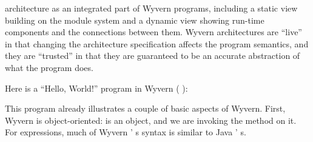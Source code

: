 \documentclass{article}
\begin{document}
\begin{mdUl}[class={ul,list-star,compact},elem={ul},data-line={36}]
\begin{mdLi}[class={li,ul-li,list-star-li,compact-li},label={[(4)]\{.ul-li-label\}},elem={li},data-line={55}]
\begin{mdP}[data-line={55}]
architecture as an integrated part of Wyvern programs, including a
static view building on the module system and a dynamic view showing
run-time components and the connections between them.  Wyvern
architectures are %
{}{\textquotedblleft}live{\textquotedblright}%
{} in that changing the architecture specification
affects the program semantics, and they are %
{}{\textquotedblleft}trusted{\textquotedblright}%
{} in that they are
guaranteed to be an accurate abstraction of what the program does.%
\end{mdP}%
%
\end{mdLi}%
\end{mdUl}%
\begin{mdP}[data-line={69}]%
{}Here is a %
{}{\textquotedblleft}Hello, World!{\textquotedblright}%
{} program in Wyvern (%
{}%
{}):%
\end{mdP}%
\begin{mdPre}[class={para-block,pre-indented},data-line={71}]%
%
\end{mdPre}%
\begin{mdP}[data-line={75}]%
{}This program already illustrates a couple of basic aspects of Wyvern.  First,
Wyvern is object-oriented: %
{}%
{} is an object, and we are invoking the
{}%
{} method on it.  For expressions, much of Wyvern%
{}{'}%
{}s syntax is similar
to Java%
{}{'}%
{}s.%
\end{mdP}%
\end{document}
